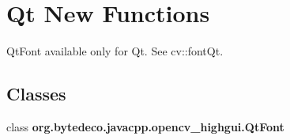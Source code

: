 \hypertarget{group__highgui__qt}{}\section{Qt New Functions}
\label{group__highgui__qt}


Qt\+Font available only for Qt. See cv\+::font\+Qt.  


\subsection*{Classes}
\begin{DoxyCompactItemize}
\item 
class {\bfseries org.\+bytedeco.\+javacpp.\+opencv\+\_\+highgui.\+Qt\+Font}
\end{DoxyCompactItemize}
